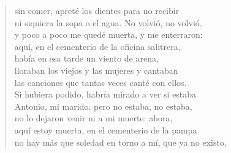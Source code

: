 \documentclass[12pt]{article}
\begin{document}
\begin{verse}
sin comer, apreté los dientes para no recibir\\
ni siquiera la sopa o el agua. No volvió, no volvió,\\
y poco a poco me quedé muerta, y me enterraron:\\
aquí, en el cementerio de la oficina salitrera,\\
había en esa tarde un viento de arena,\\
lloraban los viejos y las mujeres y cantaban\\
las canciones que tantas veces canté con ellos.\\
Si hubiera podido, habría mirado a ver si estaba\\
Antonio, mi marido, pero no estaba, no estaba,\\
no lo dejaron venir ni a mi muerte: ahora,\\
aquí estoy muerta, en el cementerio de la pampa\\
no hay más que soledad en torno a mí, que ya no existo,  

\end{verse}
\end{document}
